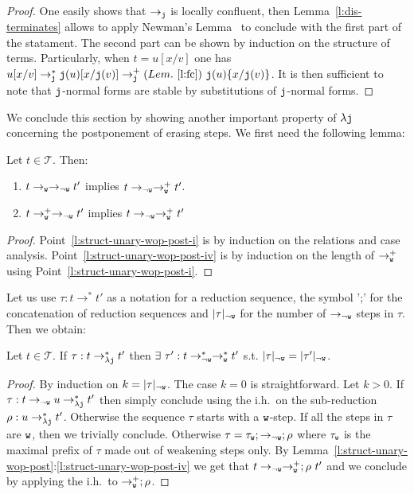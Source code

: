 \documentclass{LMCS}
\renewcommand{\>}{\rightarrow}
\def\lam{\lambda}
\newcommand{\Rew}[1]{\rightarrow_{#1}}
\newcommand{\Rewn}[2][*]{\rightarrow^{#1}_{#2}}
\newcommand{\Rewp}[1]{\rightarrow^{+}_{#1}}
\newcommand{\isubs}[1]{ \{ #1  \} }
\newcommand{\dis}{{\tt j}}
\newcommand{\ldis}{\lam{\dis}}
\newcommand{\Rewplus}[1]{\rightarrow^{+}_{#1}}
\newcommand{\Gc}{{\tt w}}
\newcommand{\ih}{i.h.}
\newcommand{\terms}{\mathcal{T}}
\newcommand{\weakmes}[1]{|#1|_{\nGc}}
\newcommand{\nGc}{{\neg\Gc}}
\begin{document}
\begin{proof}
One easily shows that $\Rew{\dis}$ is locally confluent, then
Lemma~\ref{l:dis-terminates} allows to apply Newman's Lemma~\cite{Terese03} to conclude with the first
part of the statament.  The second part can be shown by induction on
the structure of terms. Particularly, when $t = u[x/v]$ one has
$u[x/v] \Rewn{\dis} \dis(u)[x/\dis(v)] \Rewplus{\dis}
(Lem.~\ref{l:fc})\ \dis(u)\isubs{x/\dis(v)}$. It is then sufficient to
note that $\dis$-normal forms are stable by substitutions of
$\dis$-normal forms.
\end{proof}



We conclude this section by showing
another important property of $\ldis$ concerning
the  postponement  of  erasing  steps. We first need the following lemma:

\begin{lem}
\label{l:struct-unary-wop-post}
Let $t \in \terms$. Then:
\begin{enumerate}[\rm(1)]
\item \label{l:struct-unary-wop-post-i} $t \Rew{\Gc}\Rew{\nGc} t'$ implies $t \Rew{\nGc}\Rewplus{\Gc} t'$. 
\item \label{l:struct-unary-wop-post-iv} $t \Rewp{\Gc}\Rew{\nGc}t'$ implies $t \Rew{\nGc}\Rewp{\Gc}t'$
\end{enumerate}
\end{lem}

\begin{proof}
Point~\ref{l:struct-unary-wop-post-i}
is  by induction on the relations and case analysis.
Point~\ref{l:struct-unary-wop-post-iv} is by induction on the length
of $\Rewp{\Gc}$ using 
Point~\ref{l:struct-unary-wop-post-i}.
\end{proof}

Let us use $\tau:t\Rew{}^* t'$ as a notation for a reduction sequence, the symbol ';' for the concatenation of reduction sequences and $\weakmes{\tau}$ for the number of $\Rew{\nGc}$ steps in $\tau$. Then we obtain:

\begin{lem}[$\Gc$-postponement]
\label{l:w-postponement}
Let $t \in \terms$. If $\tau:t\Rewn{\ldis} t'$ then $\exists\ \tau':t\Rewn{\nGc}\Rewn{\Gc} t'$ s.t. $\weakmes{\tau}=\weakmes{\tau'}$.
\end{lem}

\begin{proof}
By   induction  on  $k=\weakmes{\tau}$.   The  case   $k=0$  is
  straightforward.  Let $k>0$.  If $\tau:t\Rew{\nGc}u\Rewn{\ldis} t'$
then   simply   conclude  using   the   \ih\   on  the   sub-reduction
$\rho:u\Rewn{\ldis}t'$.    Otherwise  the sequence $\tau$   starts   with  a
  $\Gc$-step. If all the steps  in $\tau$ are $\Gc$, then we trivially
  conclude.      Otherwise   $\tau=\tau_{\Gc};\Rew{\nGc};\rho$  where
$\tau_{\Gc}$ is  the maximal  prefix of $\tau$  made out  of weakening
steps  only.   By  Lemma~\ref{l:struct-unary-wop-post}:\ref{l:struct-unary-wop-post-iv}
we  get  that
$t\Rew{\nGc}\Rewp{\Gc};\rho\  t'$  and  we  conclude  by  applying  the
\ih\ to $\Rewp{\Gc};\rho$.
\end{proof}
\end{document}
